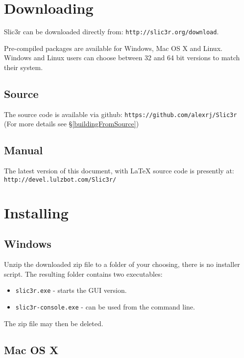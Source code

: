 
\section{Downloading}

Slic3r can be downloaded directly from: \texttt{http://slic3r.org/download}.

Pre-compiled packages are available for Windows, Mac OS X and Linux.  Windows and Linux users can choose between 32 and 64 bit versions to match their system.

\subsection{Source}
The source code is available via github: \texttt{https://github.com/alexrj/Slic3r} (For more details see §\ref{buildingFromSource})

\subsection{Manual}
The latest version of this document, with {\LaTeX} source code is presently at: \texttt{http://devel.lulzbot.com/Slic3r/}


\section{Installing}

\subsection{Windows}

Unzip the downloaded zip file to a folder of your choosing, there is no installer script. The resulting folder contains two executables:
\begin{itemize}
\item \texttt{slic3r.exe} - starts the GUI version.
\item \texttt{slic3r-console.exe} - can be used from the command line.
\end{itemize}

The zip file may then be deleted.

\subsection{Mac OS X}

